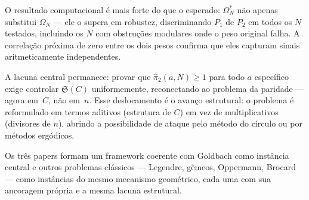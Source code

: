 \documentclass[12pt,a4paper]{article}
\theoremstyle{definition}
\theoremstyle{remark}
\newcommand{\Om}{\Omega_N}           %
\newcommand{\Oms}{\Omega^*_N}        %
\newcommand{\Ss}{\mathfrak{S}}       %
\begin{document}
	O resultado computacional é mais forte do que o esperado:
	$\Oms$ não apenas substitui $\Om$ --- ele o supera em robustez,
	discriminando $P_1$ de $P_2$ em todos os $N$ testados, incluindo os $N$
	com obstruções modulares onde o peso original falha.
	A correlação próxima de zero entre os dois pesos confirma que eles capturam
	sinais aritmeticamente independentes.
	
	A lacuna central permanece: provar que $\hat\pi_2(a,N)\geq1$ para todo $a$
	específico exige controlar $\Ss(C)$ uniformemente, reconectando ao problema
	da paridade --- agora em~$C$, não em~$n$.
	Esse deslocamento é o avanço estrutural: o problema é reformulado em termos
	aditivos (estrutura de $C$) em vez de multiplicativos (divisores de $n$),
	abrindo a possibilidade de ataque pelo método do círculo ou por métodos
	ergódicos.
	
	Os três papers formam um framework coerente com Goldbach como instância
	central e outros problemas clássicos --- Legendre, gêmeos, Oppermann,
	Brocard --- como instâncias do mesmo mecanismo geométrico, cada uma com sua
	ancoragem própria e a mesma lacuna estrutural.
	
\end{document}
